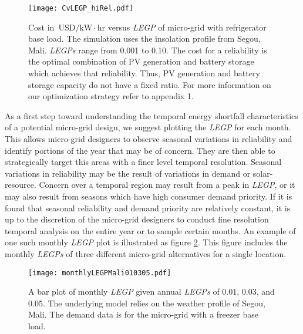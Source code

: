 \documentclass{article}
\newcommand{\unit}[1]{\ensuremath{\, \mathrm{#1}}}
\begin{document}

\begin{figure}[ht] 
  \centering
    \texttt{[image: CvLEGP\_hiRel.pdf]}
  \caption{Cost in \unit{USD/kW\! \cdot \! hr} versus \emph{LEGP} of 
micro-grid with refrigerator base load.
The simulation uses the insolation profile from Segou, Mali.
\emph{LEGPs} range from 0.001 to 0.10.
The cost for a reliability is the optimal combination of PV generation and battery storage which achieves that reliability.
Thus, PV generation and battery storage capacity do not have a fixed ratio. 
For more information on our optimization strategy refer to appendix 1.}
\label{CVsLEGP}
\end{figure}


As a first step toward understanding the temporal energy shortfall characteristics of a potential micro-grid design, we suggest plotting the \emph{LEGP} for each month. 
This allows micro-grid designers to observe seasonal variations in reliability and identify portions of the year that may be of concern.
They are then able to strategically target this areas with a finer level temporal resolution.
Seasonal variations in reliability may be the result of variations in demand or solar-resource.
Concern over a temporal region may result from a peak in \emph{LEGP}, or it may also result from seasons which have high consumer demand priority.
If it is found that seasonal reliability and demand priority are relatively 	
constant, it is up to the discretion of the micro-grid designers to 
conduct fine resolution temporal analysis on the entire year or to sample certain months.
An example of one such monthly \emph{LEGP} plot is illustrated as figure \ref{MonthBar}. 
This figure includes the monthly \emph{LEGPs} of three different micro-grid alternatives for a single location.
	


\begin{figure}[ht] 
  \centering
    \texttt{[image: monthlyLEGPMali010305.pdf]}
  \caption{A bar plot of monthly \emph{LEGP} given annual \emph{LEGPs} of 0.01, 0.03, and 0.05. 
  The underlying model relies on the weather profile of Segou, Mali.
  The demand data is for the micro-grid with a freezer base load. }
\label{MonthBar}
\end{figure}
\end{document}
